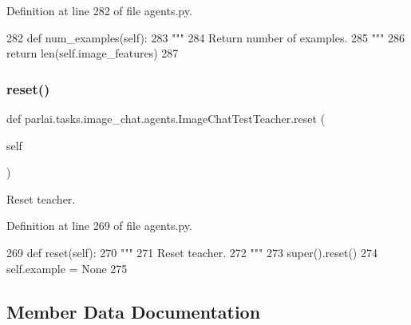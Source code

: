Definition at line 282 of file agents.\+py.


\begin{DoxyCode}
282     \textcolor{keyword}{def }num\_examples(self):
283         \textcolor{stringliteral}{"""}
284 \textcolor{stringliteral}{        Return number of examples.}
285 \textcolor{stringliteral}{        """}
286         \textcolor{keywordflow}{return} len(self.image\_features)
287 
\end{DoxyCode}
\mbox{\label{classparlai_1_1tasks_1_1image__chat_1_1agents_1_1ImageChatTestTeacher_ad1e01dc7e43fdba0bd7d82b1ac860e83}} 
\subsubsection{\texorpdfstring{reset()}{reset()}}
{\footnotesize\ttfamily def parlai.\+tasks.\+image\+\_\+chat.\+agents.\+Image\+Chat\+Test\+Teacher.\+reset (\begin{DoxyParamCaption}\item[{}]{self }\end{DoxyParamCaption})}

\begin{DoxyVerb}Reset teacher.
\end{DoxyVerb}
 

Definition at line 269 of file agents.\+py.


\begin{DoxyCode}
269     \textcolor{keyword}{def }reset(self):
270         \textcolor{stringliteral}{"""}
271 \textcolor{stringliteral}{        Reset teacher.}
272 \textcolor{stringliteral}{        """}
273         super().reset()
274         self.example = \textcolor{keywordtype}{None}
275 
\end{DoxyCode}


\subsection{Member Data Documentation}
\mbox{\label{classparlai_1_1tasks_1_1image__chat_1_1agents_1_1ImageChatTestTeacher_a7a723dab72ffcb3a7b39d0548fec9e79}} 
